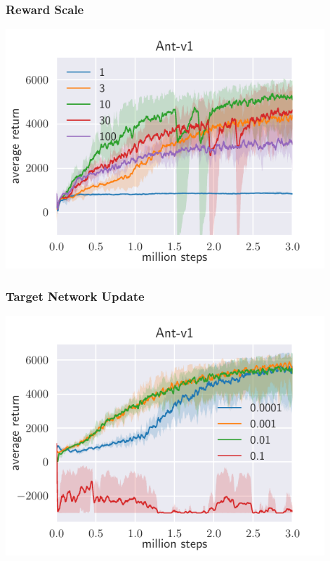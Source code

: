 \begin{frame}
	\frametitle{Reward Scale}
	\includegraphics[width=0.9\textwidth, height=0.9\textheight]{figures/reward-scale-ant.pdf}\hfill
	\cite{SAC18}
\end{frame}

\begin{frame}
	\frametitle{Target Network Update}
	\includegraphics[width=0.9\textwidth, height=0.9\textheight]{figures/soft-target-ant.pdf}\hfill
	\cite{SAC18}
\end{frame}



